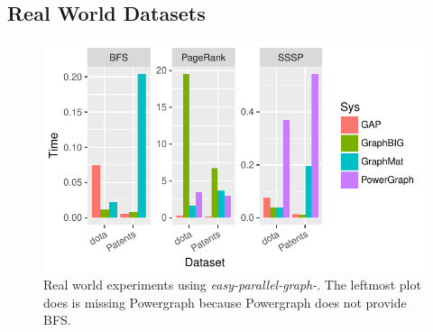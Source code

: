 \documentclass[conference]{IEEEtran}
\begin{document}
\subsection{Real World Datasets}
\begin{figure}
	\centering
		\includegraphics[width=\linewidth, trim=0 18pt 6pt 0pt, clip]{graphics/compare-realworld.pdf}
	\caption{Real world experiments using \emph{easy-parallel-graph-\textasteriskcentered}. The leftmost plot does is missing Powergraph because Powergraph does not provide BFS.}
	\label{fig:epg-realworld}
\end{figure}
\end{document}

